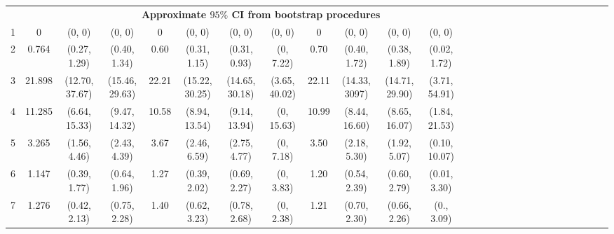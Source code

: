 \documentclass[a4paper 12pt]{article}
\numberwithin{equation}{section}
\begin{document}
\begin{small}
\begin{table}[h!]
\begin{tabular}{ccccccccccccccccccccccccccc}
 &&& \multicolumn{8}{c}{\bf Approximate $95 \%$ CI from bootstrap procedures} \\[1.5ex]
1  & 0      &(0, 0)          & (0, 0)        & 0     &(0, 0)          &  (0, 0)          & (0, 0)       & 0     &(0, 0) & (0, 0)         & (0, 0)          & \\[1ex]
2  & 0.764  & (0.27, 1.29)   & (0.40, 1.34)  & 0.60  &(0.31, 1.15)    &  (0.31, 0.93)    & (0, 7.22)    & 0.70  &(0.40, 1.72)  & (0.38, 1.89)   & (0.02, 1.72) \\[1ex]
3  & 21.898 & (12.70, 37.67) & (15.46, 29.63)& 22.21 & (15.22, 30.25) &  (14.65, 30.18)  & (3.65, 40.02)& 22.11 &(14.33, 3097) & (14.71, 29.90) & (3.71, 54.91)\\[1ex]
4  & 11.285 &(6.64, 15.33)   & (9.47, 14.32) & 10.58 &(8.94, 13.54)   &  (9.14, 13.94)   & (0, 15.63)   & 10.99 &(8.44, 16.60) & (8.65, 16.07)  & (1.84, 21.53)\\[1ex]
5  & 3.265  &(1.56, 4.46)    & (2.43, 4.39)  & 3.67  &(2.46, 6.59)    &  (2.75, 4.77)    & (0, 7.18)    & 3.50  &(2.18, 5.30)  & (1.92, 5.07)   & (0.10, 10.07)\\[1ex]
6  & 1.147  &(0.39, 1.77)    & (0.64, 1.96)  & 1.27  & (0.39, 2.02)   &  (0.69, 2.27)    & (0, 3.83)    & 1.20  & (0.54, 2.39)  & (0.60, 2.79)   & (0.01, 3.30)\\[1ex]
7  & 1.276  &(0.42, 2.13)    & (0.75, 2.28)  & 1.40  &(0.62, 3.23)    &  (0.78, 2.68)    & (0, 2.38)    & 1.21  &(0.70, 2.30)  & (0.66, 2.26)   & (0., 3.09) \\[1ex]
\hline
\end{tabular}
\end{table}
\end{small}
\end{document}
